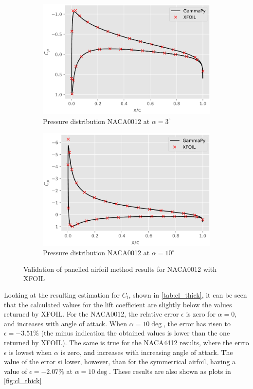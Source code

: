 \begin{figure}[h]
    \centering
    \begin{subfigure}{.5\textwidth}
      \centering
      \includegraphics[width=.9\linewidth]{static/naca0012_0_verif_thick.png}
      \caption{Pressure distribution NACA0012 at $\alpha = 3^{\circ}$}
      \label{fig:thick_verif4}
    \end{subfigure}%
    \begin{subfigure}{.5\textwidth}
      \centering
      \includegraphics[width=.9\linewidth]{static/naca0012_verif_thick.png}
      \caption{Pressure distribution NACA0012 at $\alpha = 10^{\circ}$}
      \label{fig:thick_verif5}
    \end{subfigure}
    \caption{\centering Validation of panelled airfoil method results for NACA0012 with XFOIL\cite{xfoil}}
    \label{fig:thick_verif3}
\end{figure}

Looking at the resulting estimation for $C_l$, shown in \autoref{tab:cl_thick},
it can be seen that the calculated values for the lift coefficient are slightly
below the values returned by XFOIL. For the NACA0012, the relative error
$\epsilon$ is zero for $\alpha=0$, and increases with angle of attack. When
$\alpha=10\deg$, the error has risen to $\epsilon=-3.51\%$ (the minus indication
the obtained values is lower than the one returned by XFOIL). The same is true
for the NACA4412 results, where the errro $\epsilon$ is lowest when $\alpha$ is
zero, and increases with increasing angle of attack. The value of the error si
lower, however, than for the symmetrical airfoil, having a value of
$\epsilon=-2.07\%$ at $\alpha=10\deg$. These results are also shown as plots in \autoref{fig:cl_thick}

